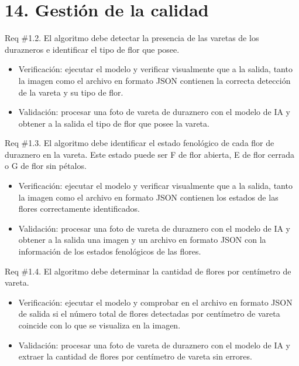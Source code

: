 \documentclass[
11pt, %
codirector, %
]{charter}
\begin{document}
\section{14. Gestión de la calidad}
\label{sec:calidad}

Req \#1.2. El algoritmo debe detectar la presencia de las varetas de los durazneros e identificar el tipo de flor que posee.

\begin{itemize}
	\item Verificación: ejecutar el modelo y verificar visualmente  que a la salida, tanto la imagen como el archivo en formato JSON contienen la correcta detección de la vareta y su tipo de flor.
	
	\item Validación: procesar una foto de vareta de duraznero con el modelo de IA y obtener a la salida el tipo de flor que posee la vareta. 
\end{itemize}

Req \#1.3. El algoritmo debe identificar el estado fenológico de cada flor de duraznero en la vareta. Este estado puede ser F de flor abierta, E de flor cerrada o G de flor sin pétalos.

\begin{itemize}
	\item Verificación: ejecutar el modelo y verificar visualmente  que a la salida, tanto la imagen como el archivo en formato JSON contienen los estados de las flores correctamente identificados.
	
	\item Validación: procesar una foto de vareta de duraznero con el modelo de IA y obtener a la salida una imagen y un archivo en formato JSON con la información de los estados fenológicos de las flores. 
\end{itemize}

Req \#1.4. El algoritmo debe determinar la cantidad de flores por centímetro de vareta.

\begin{itemize}
	\item Verificación: ejecutar el modelo y comprobar en el archivo en formato JSON de salida si el número total de flores detectadas por centímetro de vareta coincide con lo que se visualiza en la imagen.
	
	\item Validación: procesar una foto de vareta de duraznero con el modelo de IA y extraer la cantidad de flores por centímetro de vareta sin errores. 
\end{itemize}
\end{document}
